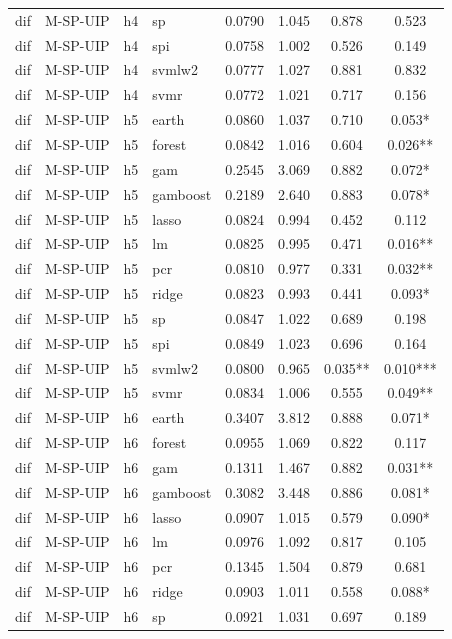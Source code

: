 \begin{ThreePartTable}
\begin{longtable}[t]{llclcccc}
dif & M-SP-UIP & h4 & sp & 0.0790 & 1.045 & 0.878 & 0.523\\
dif & M-SP-UIP & h4 & spi & 0.0758 & 1.002 & 0.526 & 0.149\\
dif & M-SP-UIP & h4 & svmlw2 & 0.0777 & 1.027 & 0.881 & 0.832\\
dif & M-SP-UIP & h4 & svmr & 0.0772 & 1.021 & 0.717 & 0.156\\
\addlinespace
dif & M-SP-UIP & h5 & earth & 0.0860 & 1.037 & 0.710 & 0.053*\\
dif & M-SP-UIP & h5 & forest & 0.0842 & 1.016 & 0.604 & 0.026**\\
dif & M-SP-UIP & h5 & gam & 0.2545 & 3.069 & 0.882 & 0.072*\\
dif & M-SP-UIP & h5 & gamboost & 0.2189 & 2.640 & 0.883 & 0.078*\\
dif & M-SP-UIP & h5 & lasso & 0.0824 & 0.994 & 0.452 & 0.112\\
dif & M-SP-UIP & h5 & lm & 0.0825 & 0.995 & 0.471 & 0.016**\\
dif & M-SP-UIP & h5 & pcr & 0.0810 & 0.977 & 0.331 & 0.032**\\
dif & M-SP-UIP & h5 & ridge & 0.0823 & 0.993 & 0.441 & 0.093*\\
dif & M-SP-UIP & h5 & sp & 0.0847 & 1.022 & 0.689 & 0.198\\
dif & M-SP-UIP & h5 & spi & 0.0849 & 1.023 & 0.696 & 0.164\\
dif & M-SP-UIP & h5 & svmlw2 & 0.0800 & 0.965 & 0.035** & 0.010***\\
dif & M-SP-UIP & h5 & svmr & 0.0834 & 1.006 & 0.555 & 0.049**\\
\addlinespace
dif & M-SP-UIP & h6 & earth & 0.3407 & 3.812 & 0.888 & 0.071*\\
dif & M-SP-UIP & h6 & forest & 0.0955 & 1.069 & 0.822 & 0.117\\
dif & M-SP-UIP & h6 & gam & 0.1311 & 1.467 & 0.882 & 0.031**\\
dif & M-SP-UIP & h6 & gamboost & 0.3082 & 3.448 & 0.886 & 0.081*\\
dif & M-SP-UIP & h6 & lasso & 0.0907 & 1.015 & 0.579 & 0.090*\\
dif & M-SP-UIP & h6 & lm & 0.0976 & 1.092 & 0.817 & 0.105\\
dif & M-SP-UIP & h6 & pcr & 0.1345 & 1.504 & 0.879 & 0.681\\
dif & M-SP-UIP & h6 & ridge & 0.0903 & 1.011 & 0.558 & 0.088*\\
dif & M-SP-UIP & h6 & sp & 0.0921 & 1.031 & 0.697 & 0.189\\

\end{longtable}
\end{ThreePartTable}
